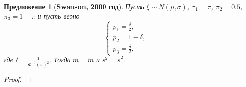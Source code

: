 \documentclass[specialist, substylefile = spbu.rtx,
subf,href,colorlinks=true, 12pt]{disser}
\newtheorem{proposition}[theorem]{Предложение}
\begin{document}
\begin{proposition}[\textbf{Swanson, 2000 год}]\label{pr2}
	Пусть $\xi\sim N(\mu, \sigma)$, $\pi_{1} = \pi$,  $\pi_{2} = 0.5$, $\pi_{3} = 1-\pi$ и пусть верно 
	\begin{equation}
		\begin{cases}
			p_{1} = \displaystyle{\frac{\delta}{2}},\\ 
			p_{2}=1-\delta , \\ 
			p_{3}=\displaystyle{\frac{\delta}{2}},
		\end{cases}\label{3}
	\end{equation}
	где $\delta  = \displaystyle{\frac{1}{\Phi ^{-1}(\pi)^{2}}}$. Тогда $m=\tilde{m}$ и $s^{2} = \tilde{s}^{2}$.
\end{proposition}
\begin{proof}
	

\end{proof}
\end{document}

